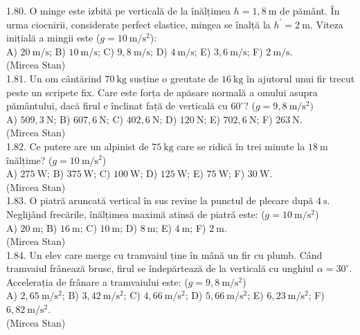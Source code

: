 1.80. O minge este izbită pe verticală de la înălțimea $h=1,8 \mathrm{~m}$ de pământ. În urma ciocnirii, considerate perfect elastice, mingea se înalță la $h^{\prime}=2 \mathrm{~m}$. Viteza inițială a mingii este ($g=10 \mathrm{~m} / \mathrm{s}^{2}$):\\ A) $20 \mathrm{~m} / \mathrm{s}$; B) $10 \mathrm{~m} / \mathrm{s}$; C) $9,8 \mathrm{~m} / \mathrm{s}$; D) $4 \mathrm{~m} / \mathrm{s}$; E) $3,6 \mathrm{~m} / \mathrm{s}$; F) $2 \mathrm{~m} / \mathrm{s}$.\\ (Mircea Stan)\\

1.81. Un om cântărind $70 \mathrm{~kg}$ susține o greutate de $16 \mathrm{~kg}$ în ajutorul unui fir trecut peste un scripete fix. Care este forța de apăsare normală a omului asupra pământului, dacă firul e înclinat față de verticală cu $60^{\circ}$? ($g=9,8 \mathrm{~m} / \mathrm{s}^{2})$\\ A) $509,3 \mathrm{~N}$; B) $607,6 \mathrm{~N}$; C) $402,6 \mathrm{~N}$; D) $120 \mathrm{~N}$; E) $702,6 \mathrm{~N}$; F) $263 \mathrm{~N}$.\\ (Mircea Stan)\\

1.82. Ce putere are un alpinist de $75 \mathrm{~kg}$ care se ridică în trei minute la $18 \mathrm{~m}$ înălțime? ($g=10 \mathrm{~m} / \mathrm{s}^{2}$)\\ A) $275 \mathrm{~W}$; B) $375 \mathrm{~W}$; C) $100 \mathrm{~W}$; D) $125 \mathrm{~W}$; E) $75 \mathrm{~W}$; F) $30 \mathrm{~W}$.\\ (Mircea Stan)\\

1.83. O piatră aruncată vertical în sus revine la punctul de plecare după $4 \mathrm{~s}$. Neglijând frecările, înălțimea maximă atinsă de piatră este: ($g=10 \mathrm{~m} / \mathrm{s}^{2}$)\\ A) $20 \mathrm{~m}$; B) $16 \mathrm{~m}$; C) $10 \mathrm{~m}$; D) $8 \mathrm{~m}$; E) $4 \mathrm{~m}$; F) $2 \mathrm{~m}$.\\ (Mircea Stan)\\

1.84. Un elev care merge cu tramvaiul ține în mână un fir cu plumb. Când tramvaiul frânează brusc, firul se îndepărtează de la verticală cu unghiul $\alpha=30^{\circ}$. Accelerația de frânare a tramvaiului este: ($g=9,8 \mathrm{~m} / \mathrm{s}^{2}$)\\ A) $2,65 \mathrm{~m} / \mathrm{s}^{2}$; B) $3,42 \mathrm{~m} / \mathrm{s}^{2}$; C) $4,66 \mathrm{~m} / \mathrm{s}^{2}$; D) $5,66 \mathrm{~m} / \mathrm{s}^{2}$; E) $6,23 \mathrm{~m} / \mathrm{s}^{2}$; F) $6,82 \mathrm{~m} / \mathrm{s}^{2}$.\\ (Mircea Stan)\\

